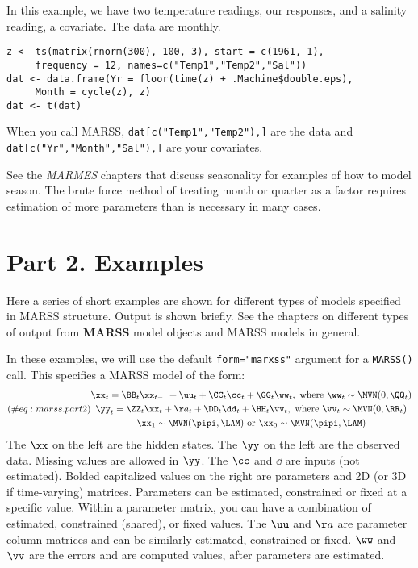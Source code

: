 \documentclass[12pt,]{book}
\begin{document}
In this example, we have two temperature readings, our responses, and a salinity reading, a covariate. The data are monthly.

\begin{verbatim}
z <- ts(matrix(rnorm(300), 100, 3), start = c(1961, 1),
     frequency = 12, names=c("Temp1","Temp2","Sal"))
dat <- data.frame(Yr = floor(time(z) + .Machine$double.eps), 
     Month = cycle(z), z)
dat <- t(dat)
\end{verbatim}

When you call MARSS, \texttt{dat{[}c("Temp1","Temp2"),{]}} are the data and \texttt{dat{[}c("Yr","Month","Sal"),{]}} are your covariates.

See the \emph{MARMES} chapters that discuss seasonality for examples of how to model season. The brute force method of treating month or quarter as a factor requires estimation of more parameters than is necessary in many cases.

\hypertarget{part2}{%
\chapter*{Part 2. Examples}\label{part2}}


Here a series of short examples are shown for different types of models specified in MARSS structure. Output is shown briefly. See the chapters on different types of output from \textbf{MARSS} model objects and MARSS models in general.

In these examples, we will use the default \texttt{form="marxss"} argument for a \texttt{MARSS()} call. This specifies a MARSS model of the form:
\begin{equation}(\#eq:marss.part2)
\begin{gather}
\xx_t = \BB_t\xx_{t-1} + \uu_t + \CC_t\cc_t + \GG_t\ww_t, \text{ where } \ww_t \sim \MVN(0,\QQ_t)\\
\yy_t = \ZZ_t\xx_t + \aa_t + \DD_t\dd_t + \HH_t\vv_t, \text{ where } \vv_t \sim \MVN(0,\RR_t)\\
\xx_1 \sim \MVN(\pipi,\LAM) \text{ or } \xx_0 \sim \MVN(\pipi,\LAM)
\end{gather}
\end{equation}
The \(\xx\) on the left are the hidden states. The \(\yy\) on the left are the observed data. Missing values are allowed in \(\yy\). The \(\cc\) and \(\dd\) are inputs (not estimated). Bolded capitalized values on the right are parameters and 2D (or 3D if time-varying) matrices. Parameters can be estimated, constrained or fixed at a specific value. Within a parameter matrix, you can have a combination of estimated, constrained (shared), or fixed values. The \(\uu\) and \(\aa\) are parameter column-matrices and can be similarly estimated, constrained or fixed. \(\ww\) and \(\vv\) are the errors and are computed values, after parameters are estimated.
\end{document}
